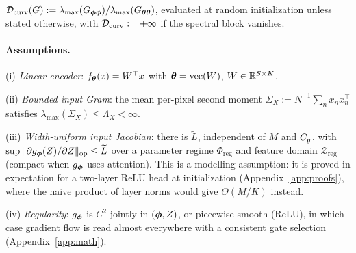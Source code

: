 \begin{definition}
\label{def:dcurv}
$\mathcal{D}_{\mathrm{curv}}(G):=\lambda_{\max}(G_{{\boldsymbol{\phi}}{\boldsymbol{\phi}}})/\lambda_{\max}(G_{{\boldsymbol{\theta}}{\boldsymbol{\theta}}})$,
evaluated at random initialization unless stated otherwise, with
$\mathcal{D}_{\mathrm{curv}}:=+\infty$ if the spectral block vanishes.
\end{definition}

\paragraph{Assumptions.}
\begin{assumption}
\label{ass:linear}
(i) \emph{Linear encoder}: $f_{\boldsymbol{\theta}}(x)=W^\top x$ with
${\boldsymbol{\theta}}=\mathrm{vec}(W)$, $W\in\mathbb{R}^{S\times K}$.
\end{assumption}
\begin{assumption}
\label{ass:subg}
(ii) \emph{Bounded input Gram}: the mean per-pixel second moment
$\Sigma_X:=N^{-1}\sum_n x_nx_n^\top$ satisfies
$\lambda_{\max}(\Sigma_X)\le\Lambda_X<\infty$.
\end{assumption}
\begin{assumption}
\label{ass:inputlip}
(iii) \emph{Width-uniform input Jacobian}: there is $\widetilde L$,
independent of $M$ and $C_g$, with
$\sup\|\partial g_{\boldsymbol{\phi}}(Z)/\partial Z\|_{\mathrm{op}}\le\widetilde L$ over a
parameter regime $\Phi_{\mathrm{reg}}$ and feature domain
$\mathcal{Z}_{\mathrm{reg}}$ (compact when $g_{\boldsymbol{\phi}}$ uses attention). This
is a modelling assumption: it is proved in expectation for a two-layer ReLU
head at initialization (Appendix~\ref{app:proofs}), where the naive product
of layer norms would give $\Theta(M/K)$ instead.
\end{assumption}
\begin{assumption}
\label{ass:reg}
(iv) \emph{Regularity}: $g_{\boldsymbol{\phi}}$ is $C^2$ jointly in $({\boldsymbol{\phi}},Z)$, or
piecewise smooth (ReLU), in which case gradient flow is read almost
everywhere with a consistent gate selection
(Appendix~\ref{app:math}).
\end{assumption}
